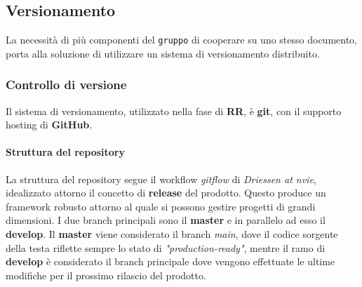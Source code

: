\subsection{Versionamento}
La necessità di più componenti del \texttt{gruppo} di cooperare su uno stesso documento, porta alla soluzione di utilizzare un sistema di versionamento distribuito. 


\subsubsection{Controllo di versione}
Il sistema di versionamento, utilizzato nella fase di \textbf{RR}, è \textbf{git}, con il supporto hosting di \textbf{GitHub}.

	\paragraph{Struttura del repository} 
La struttura del repository segue il workflow \textit{gitflow} di \textit{Driessen at nvie}, idealizzato attorno il concetto di \textbf{release} del prodotto. Questo produce
un framework robusto attorno al quale si possono gestire progetti di grandi dimensioni. I due branch principali sono il \textbf{master} e in parallelo ad esso il \textbf{develop}. 
Il \textbf{master} viene considerato il branch \textit{main}, dove il codice sorgente della testa riflette sempre lo stato di \textit{"production-ready"},
mentre il ramo di \textbf{develop} è considerato il branch principale dove vengono effettuate le ultime modifiche per il prossimo rilascio del prodotto. 


